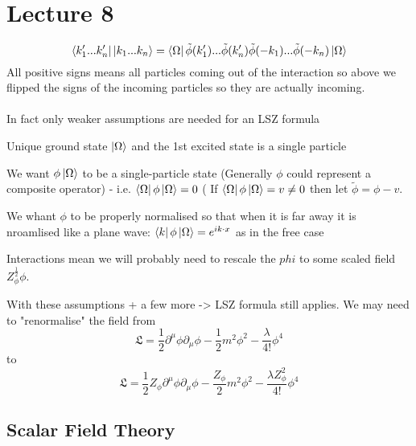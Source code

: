 \documentclass{article}
\begin{document}
\section{Lecture 8}
$$
\bra{k_1'...k_n'}\ket{k_1...k_n} = \bra{\Omega} \tilde \phi(k_1')... \tilde \phi(k'_n) \tilde \phi(- k_1) ...\tilde \phi(-k_n) \ket{\Omega}
$$
All positive signs means all particles coming out of the interaction so above we flipped the signs of the incoming particles so they are actually incoming.\\\\
In fact only weaker assumptions are needed for an LSZ formula\\
\begin{itemlist}
\item Unique ground state $\ket{\Omega}$ and the 1st excited state is a single particle\\
\item We want $\phi \ket{\Omega}$ to be a single-particle state (Generally $\phi$ could represent a composite operator) - i.e. $\bra{\Omega} \phi \ket{\Omega} = 0$ ( If $\bra{\Omega} \phi \ket{\Omega} = v \neq 0$ then let $\tilde \phi = \phi - v$.\\
\item We whant $\phi$ to be properly normalised so that when it is far away it is nroamlised like a plane wave: $\bra{k} \phi \ket{\Omega} = e^{ik \cdot x}$ as in the free case\\
\item Interactions mean we will probably need to rescale the $phi$ to some scaled field $Z_{\phi}^{\frac{1}{2}} \phi$.\\
\end{itemlist}
With these assumptions + a few more -> LSZ formula still applies. 
We may need to "renormalise" the field from
$$
\mathfrak{L} = \frac{1}{2} \partial^{\mu} \phi \partial_{\mu} \phi - \frac{1}{2} m^2 \phi^2 - \frac{\lambda}{4!} \phi^4
$$
to
$$
\mathfrak{L} = \frac{1}{2}  Z_{\phi} \partial^{\mu} \phi \partial_{\mu} \phi - \frac{Z_{\phi}}{2} m^2 \phi^2 - \frac{\lambda Z_{\phi}^2}{4!} \phi^4
$$
\subsection{Scalar Field Theory}
\end{document}
